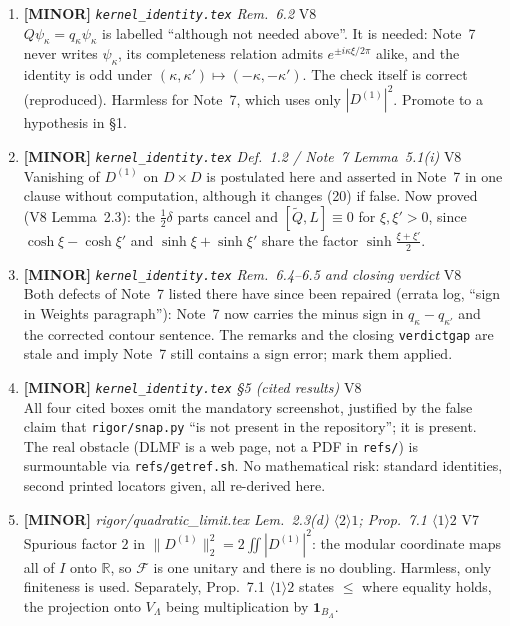 \documentclass[11pt]{article}
\begin{document}
\begin{enumerate}[leftmargin=1.6em,itemsep=6pt]
\item \textbf{[MINOR]} \emph{\texttt{kernel\_identity.tex} Rem.~6.2} \hfill\textsc{V8}\\ \(Q\psi_\kappa=q_\kappa\psi_\kappa\) is labelled ``although not needed above''. It is needed: Note~7 never writes \(\psi_\kappa\), its completeness relation admits \(e^{\pm i\kappa\xi/2\pi}\) alike, and the identity is odd under \((\kappa,\kappa')\mapsto(-\kappa,-\kappa')\). The check itself is correct (reproduced). Harmless for Note~7, which uses only \(|D^{(1)}|^2\). Promote to a hypothesis in \S1.
\item \textbf{[MINOR]} \emph{\texttt{kernel\_identity.tex} Def.~1.2 / Note~7 Lemma~5.1(i)} \hfill\textsc{V8}\\ Vanishing of \(D^{(1)}\) on \(D\times D\) is postulated here and asserted in Note~7 in one clause without computation, although it changes (20) if false. Now proved (V8 Lemma~2.3): the \(\tfrac12\delta\) parts cancel and \([\widetilde Q,L]\equiv0\) for \(\xi,\xi'>0\), since \(\cosh\xi-\cosh\xi'\) and \(\sinh\xi+\sinh\xi'\) share the factor \(\sinh\frac{\xi+\xi'}2\).
\item \textbf{[MINOR]} \emph{\texttt{kernel\_identity.tex} Rem.~6.4--6.5 and closing verdict} \hfill\textsc{V8}\\ Both defects of Note~7 listed there have since been repaired (errata log, ``sign in Weights paragraph''): Note~7 now carries the minus sign in \(q_\kappa-q_{\kappa'}\) and the corrected contour sentence. The remarks and the closing \texttt{verdictgap} are stale and imply Note~7 still contains a sign error; mark them applied.
\item \textbf{[MINOR]} \emph{\texttt{kernel\_identity.tex} \S5 (cited results)} \hfill\textsc{V8}\\ All four cited boxes omit the mandatory screenshot, justified by the false claim that \texttt{rigor/snap.py} ``is not present in the repository''; it is present. The real obstacle (DLMF is a web page, not a PDF in \texttt{refs/}) is surmountable via \texttt{refs/getref.sh}. No mathematical risk: standard identities, second printed locators given, all re-derived here.
\item \textbf{[MINOR]} \emph{rigor/quadratic\_limit.tex Lem.~2.3(d) \(\langle2\rangle1\); Prop.~7.1 \(\langle1\rangle2\)} \hfill\textsc{V7}\\ Spurious factor \(2\) in \(\lVert D^{(1)}\rVert_2^2=2\iint|D^{(1)}|^2\): the modular coordinate maps all of \(I\) onto \(\mathbb R\), so \(\mathcal F\) is one unitary and there is no doubling. Harmless, only finiteness is used. Separately, Prop.~7.1 \(\langle1\rangle2\) states \(\le\) where equality holds, the projection onto \(V_\Lambda\) being multiplication by \(\mathbf 1_{B_\Lambda}\).

\end{enumerate}
\end{document}
